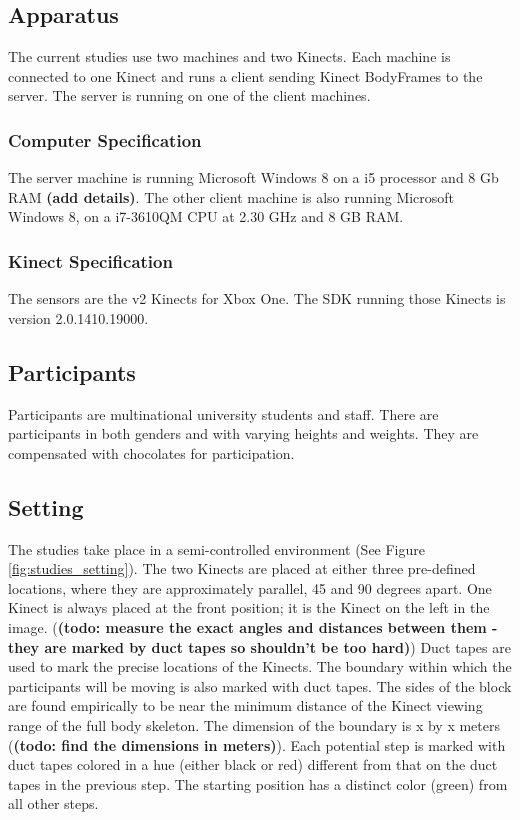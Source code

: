 \documentclass{sigchi}
\begin{document}
\subsection{Apparatus}

The current studies use two machines and two Kinects. Each machine is connected to one Kinect and runs a client sending Kinect BodyFrames to the server. The server is running on one of the client machines.

\subsubsection{Computer Specification}

The server machine is running Microsoft Windows 8 on a i5 processor and 8 Gb RAM \textbf{(add details)}. The other client machine is also running Microsoft Windows 8, on a i7-3610QM CPU at 2.30 GHz and 8 GB RAM.

\subsubsection{Kinect Specification}

The sensors are the v2 Kinects for Xbox One. The SDK running those Kinects is version 2.0.1410.19000.

\subsection{Participants}

Participants are multinational university students and staff. There are participants in both genders and with varying heights and weights. They are compensated with chocolates for participation.

\subsection{Setting}

The studies take place in a semi-controlled environment (See Figure \ref{fig:studies_setting}). The two Kinects are placed at either three pre-defined locations, where they are approximately parallel, 45 and 90 degrees apart. One Kinect is always placed at the front position; it is the Kinect on the left in the image. (\textbf{(todo: measure the exact angles and distances between them - they are marked by duct tapes so shouldn't be too hard)}) Duct tapes are used to mark the precise locations of the Kinects. The boundary within which the participants will be moving is also marked with duct tapes. The sides of the block are found empirically to be near the minimum distance of the Kinect viewing range of the full body skeleton. The dimension of the boundary is x by x meters (\textbf{(todo: find the dimensions in meters)}). Each potential step is marked with duct tapes colored in a hue (either black or red) different from that on the duct tapes in the previous step. The starting position has a distinct color (green) from all other steps.
\end{document}

